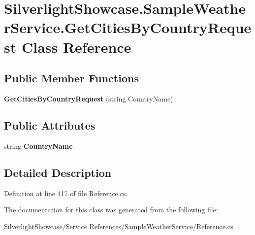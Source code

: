\hypertarget{class_silverlight_showcase_1_1_sample_weather_service_1_1_get_cities_by_country_request}{
\section{SilverlightShowcase.SampleWeatherService.GetCitiesByCountryRequest Class Reference}
\label{class_silverlight_showcase_1_1_sample_weather_service_1_1_get_cities_by_country_request}
}
\subsection*{Public Member Functions}
\begin{DoxyCompactItemize}
\item 
\hypertarget{class_silverlight_showcase_1_1_sample_weather_service_1_1_get_cities_by_country_request_ade97629ca20469857a4501d8476a7745}{
{\bfseries GetCitiesByCountryRequest} (string CountryName)}
\label{class_silverlight_showcase_1_1_sample_weather_service_1_1_get_cities_by_country_request_ade97629ca20469857a4501d8476a7745}

\end{DoxyCompactItemize}
\subsection*{Public Attributes}
\begin{DoxyCompactItemize}
\item 
\hypertarget{class_silverlight_showcase_1_1_sample_weather_service_1_1_get_cities_by_country_request_a92122743d76c0a295b60711846d4a52a}{
string {\bfseries CountryName}}
\label{class_silverlight_showcase_1_1_sample_weather_service_1_1_get_cities_by_country_request_a92122743d76c0a295b60711846d4a52a}

\end{DoxyCompactItemize}


\subsection{Detailed Description}


Definition at line 417 of file Reference.cs.

The documentation for this class was generated from the following file:\begin{DoxyCompactItemize}
\item 
SilverlightShowcase/Service References/SampleWeatherService/Reference.cs\end{DoxyCompactItemize}
